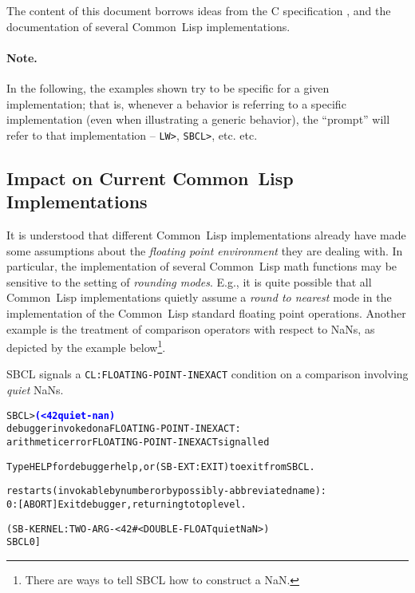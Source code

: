 \documentclass[10pt,fleqn]{article}
\newcommand{\CL}{\textsf{Common~Lisp}}
\newcommand{\CLang}{\textsf{C}}
\newcommand{\code}[1]{\texttt{#1}}
\newcommand{\codeprompt}[1]{\textcolor{blue}{\textbf{#1}}}
\begin{document}
\vspace*{3mm}

The content of this document borrows ideas from the \CLang{}
specification \cite{2018:C18}, and the documentation of
several \CL{} implementations.

\paragraph{Note.} In the following, the examples shown try to be
specific for a given implementation; that is, whenever a behavior is
referring to a specific implementation (even when illustrating a
generic behavior), the ``prompt'' will refer to that implementation --
\code{LW>}, \code{SBCL>}, etc. etc.


\subsection{Impact on Current \CL{} Implementations}

It is understood that different \CL{} implementations already have
made some assumptions about the \emph{floating point environment} they
are dealing with.  In particular, the implementation of several \CL{}
math functions may be sensitive to the
setting of \emph{rounding modes}.  E.g., it is quite possible that all
\CL{} implementations quietly assume a \emph{round to nearest} mode in
the implementation of the \CL{} standard floating point operations.
Another example is the treatment of comparison operators with respect
to NaNs, as depicted by the example below\footnote{There are ways to
  tell SBCL how to construct a NaN.}.

\vspace*{3mm}

\noindent
SBCL signals a \code{CL:FLOATING-POINT-INEXACT} condition on a
comparison involving \emph{quiet} NaNs.
\begin{alltt}
SBCL> \codeprompt{(< 42 quiet-nan)}
debugger invoked on a FLOATING-POINT-INEXACT:
  arithmetic error FLOATING-POINT-INEXACT signalled

Type HELP for debugger help, or (SB-EXT:EXIT) to exit from SBCL.

restarts (invokable by number or by possibly-abbreviated name):
  0: [ABORT] Exit debugger, returning to top level.

(SB-KERNEL:TWO-ARG-< 42 #<DOUBLE-FLOAT quiet NaN>)
SBCL 0]
\end{alltt}

\vspace*{3mm}
\end{document}
